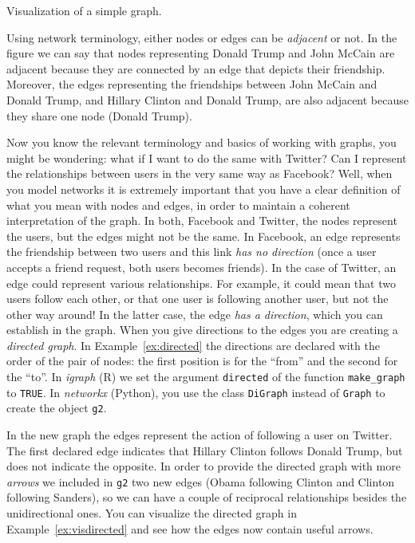 \begin{ccsexample}
  \caption{Visualization of a simple graph.}
  \label{ex:visgraph}
\end{ccsexample}

Using network terminology, either nodes or edges can be \textit{adjacent} or not. In the figure we can say that nodes representing Donald Trump and John McCain are adjacent because they are connected by an edge that depicts their friendship. Moreover, the edges representing the friendships between John McCain and Donald Trump, and Hillary Clinton and Donald Trump, are also adjacent because they share one node (Donald Trump).

Now you know the relevant terminology and basics of working with graphs, you might be wondering: what if I want to do the same with Twitter? Can I represent the relationships between users in the very same way as Facebook? Well, when you model networks it is extremely important that you have a clear definition of what you mean with nodes and edges, in order to maintain a coherent interpretation of the graph. In both, Facebook and Twitter, the nodes represent the users, but the edges might not be the same. In Facebook, an edge represents the friendship between two users and this link \textit{has no direction} (once a user accepts a friend request, both users becomes friends). In the case of Twitter, an edge could represent various relationships. For example, it could mean that two users follow each other, or that one user is following another user, but not the other way around! In the latter case, the edge \textit{has a direction}, which you can establish in the graph. When you give directions to the edges you are creating a \textit{directed graph}. In Example~\ref{ex:directed} the directions are declared with the order of the pair of nodes: the first position is for the ``from'' and the second for the ``to''. In \emph{igraph} (R) we  set the argument \verb+directed+ of the function \texttt{make\_graph} to \verb+TRUE+. In \emph{networkx} (Python), you use the class \texttt{DiGraph} instead of \texttt{Graph} to create the object \texttt{g2}.


In the new graph the edges represent the action of following a user on Twitter. The first declared edge indicates that Hillary Clinton follows Donald Trump, but does not indicate the opposite. In order to provide the directed graph with more \textit{arrows} we included in \texttt{g2} two new edges (Obama following Clinton and Clinton following Sanders), so we can have a couple of reciprocal relationships besides the unidirectional ones. You can visualize the directed graph in Example~\ref{ex:visdirected} and see how the edges now contain useful arrows.

